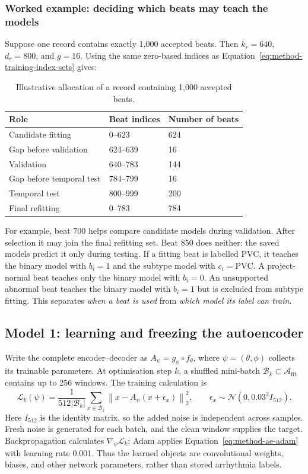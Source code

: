 \subsubsection*{Worked example: deciding which beats may teach the models}

Suppose one record contains exactly 1,000 accepted beats. Then
$k_r=640$, $d_r=800$, and $g=16$. Using the same zero-based indices as
Equation~\ref{eq:method-training-index-sets} gives:
\begin{table}[H]
\centering
\small
\caption{Illustrative allocation of a record containing 1,000 accepted beats.}
\label{tab:method-example-split}
\begin{tabular}{@{}lll@{}}
\toprule
Role & Beat indices & Number of beats\\
\midrule
Candidate fitting & 0--623 & 624\\
Gap before validation & 624--639 & 16\\
Validation & 640--783 & 144\\
Gap before temporal test & 784--799 & 16\\
Temporal test & 800--999 & 200\\
\midrule
Final refitting & 0--783 & 784\\
\bottomrule
\end{tabular}
\end{table}
For example, beat 700 helps compare candidate models during validation. After
selection it may join the final refitting set. Beat 850 does neither: the
saved models predict it only during testing. If a fitting beat is labelled
PVC, it teaches the binary model with $b_i=1$ and the subtype model with
$c_i=\mathrm{PVC}$. A project-normal beat teaches only the binary model with
$b_i=0$. An unsupported abnormal beat teaches the binary model with $b_i=1$
but is excluded from subtype fitting. This separates \emph{when a beat is
used} from \emph{which model its label can train}.

\subsection{Model 1: learning and freezing the autoencoder}

Write the complete encoder--decoder as $A_\psi=g_\phi\circ f_\theta$, where
$\psi=(\theta,\phi)$ collects its trainable parameters. At optimisation
step $k$, a shuffled mini-batch $\mathcal{B}_k\subset\mathcal{A}_{\mathrm{fit}}$
contains up to 256 windows. The training calculation is
\begin{equation}
 \mathcal{L}_k(\psi)=\frac{1}{512|\mathcal{B}_k|}
 \sum_{x\in\mathcal{B}_k}
 \left\|x-A_\psi(x+\epsilon_x)\right\|_2^2,
 \qquad \epsilon_x\sim\mathcal{N}(0,0.03^2I_{512}).
 \label{eq:method-sequential-ae-loss}
\end{equation}
Here $I_{512}$ is the identity matrix, so the added noise is independent
across samples. Fresh noise is generated for each batch, and the clean window supplies the
target. Backpropagation calculates $\nabla_\psi\mathcal{L}_k$; Adam applies
Equation~\ref{eq:method-ae-adam} with learning rate 0.001. Thus the learned
objects are convolutional weights, biases, and other network parameters,
rather than stored arrhythmia labels.


